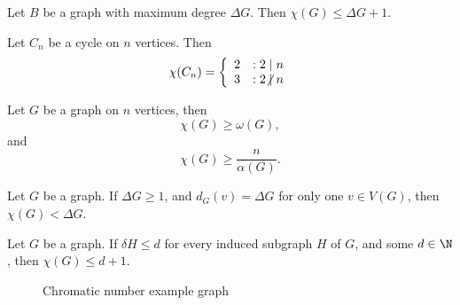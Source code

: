 \documentclass[12pt]{article}
\begin{document}
\begin{prop}\label{chromatic-number-graph-degree}
    Let $B$ be a graph with maximum degree $\Delta G$. Then $\chi(G) \leq \Delta G + 1$.
\end{prop}

\begin{prop}\label{cycle-chromatic-parity}
    Let $C_n$ be a cycle on $n$ vertices. Then
    \[\chi(C_n) = \left\{
        \begin{array}{lr}
            2 & : 2 \mid n \\
            3 & : 2 \centernot\mid n
        \end{array}\right.\]
\end{prop}

\begin{prop}\label{chromatic-cliques-independent-sets}
    Let $G$ be a graph on $n$ vertices, then
    \[\chi(G) \geq \omega(G),\] and
    \[\chi(G) \geq \frac{n}{\alpha(G)}.\]
\end{prop}

\begin{prop}\label{single-maximum-degree}
    Let $G$ be a graph. If $\Delta G \geq 1$, and $d_G(v) = \Delta G$ for only one $v \in V(G)$, then $\chi(G) < \Delta G$.
\end{prop}

\begin{prop}\label{induced-subgraphs-minimum-degree}
    Let $G$ be a graph. If $\delta H \leq d$ for every induced subgraph $H$ of $G$, and some $d \in \N$, then $\chi(G) \leq d+1$.
\end{prop}

\begin{figure}[ht!]
    \centering
\caption{Chromatic number example graph}
\label{fig:chromatic-graph-example}
\end{figure}
\end{document}
